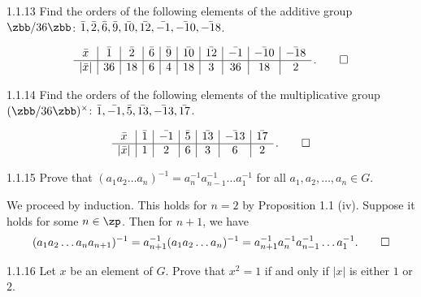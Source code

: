 \begin{exercise}{1.1.13}
    Find the orders of the following elements of the additive group $\zbb/36\zbb$: $\bar{1}, \bar{2}, \bar{6}, \bar{9}, \bar{10}, \bar{12}, \bar{-1}, \bar{-10},\\ \bar{-18}$.
\end{exercise}

\begin{sol}
    \[
    	\begin{array}{c|c|c|c|c|c|c|c|c|c}
            \bar x & \bar 1 & \bar 2 & \bar 6 & \bar 9 & \bar{10} & \bar{12} & \bar{-1} & \bar{-10} & \bar{-18} \\
            \hline
            |\bar x| & 36 & 18 & 6 & 4 & 18 & 3 & 36 & 18 & 2
        \end{array}\,. \qedhere
	\]
\end{sol}

\begin{exercise}{1.1.14}
    Find the orders of the following elements of the multiplicative group $(\zbb/36\zbb)^{\times}$: $\bar{1}, \bar{-1}, \bar{5}, \bar{13}, \bar{-13},\\ \bar{17}$.
\end{exercise}

\begin{sol}
    \[
    	\begin{array}{c|c|c|c|c|c|c}
            \bar x & \bar 1 & \bar{-1} & \bar 5 & \bar{13} & \bar{-13} & \bar{17} \\
            \hline
            |\bar x| & 1 & 2 & 6 & 3 & 6 & 2
        \end{array}\,. \qedhere
	\]
\end{sol}

\begin{exercise}{1.1.15}
    Prove that $(a_1 a_2 \ldots a_n)^{-1} = a_n^{-1} a_{n-1}^{-1} \ldots a_1^{-1}$ for all $a_1, a_2, \ldots, a_n \in G$.
\end{exercise}

\begin{sol}
    We proceed by induction.
	This holds for $n = 2$ by Proposition 1.1 (iv).
	Suppose it holds for some $n \in \zp$.
	Then for $n + 1$, we have
    \[
    	(a_1 a_2 \ldots a_n a_{n+1})^{-1} = a_{n+1}^{-1} (a_1 a_2 \ldots a_n)^{-1} = a_{n+1}^{-1} a_n^{-1} a_{n-1}^{-1} \ldots a_1^{-1}. \qedhere
    \]
\end{sol}

\begin{exercise}{1.1.16}
    Let $x$ be an element of $G$.
	Prove that $x^2 = 1$ if and only if $|x|$ is either $1$ or $2$.
\end{exercise}

